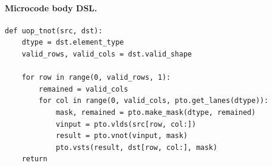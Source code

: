 \paragraph{Microcode body DSL.}
\begin{lstlisting}[style=ptocode]
def uop_tnot(src, dst):
    dtype = dst.element_type
    valid_rows, valid_cols = dst.valid_shape

    for row in range(0, valid_rows, 1):
        remained = valid_cols
        for col in range(0, valid_cols, pto.get_lanes(dtype)):
            mask, remained = pto.make_mask(dtype, remained)
            vinput = pto.vlds(src[row, col:])
            result = pto.vnot(vinput, mask)
            pto.vsts(result, dst[row, col:], mask)
    return
\end{lstlisting}
\Needspace{0.34\textheight}
